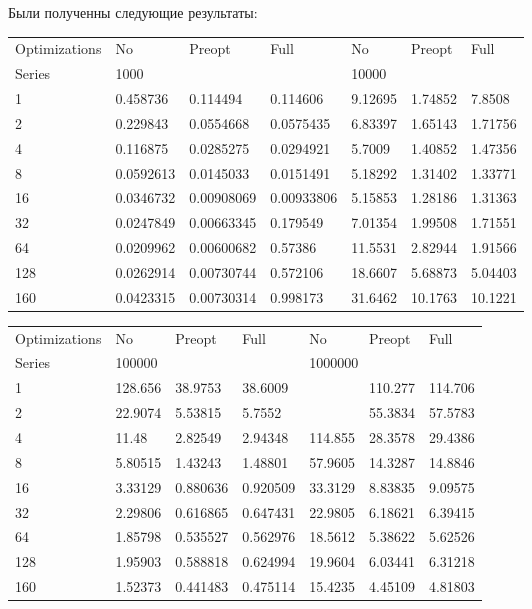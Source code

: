 \documentclass[a4paper,12pt,titlepage,finall]{article}
\begin{document}
\par
Были полученны следующие результаты:
\begin{table}[h]
\begin{tabular}{lllllll}
Optimizations & No        & Preopt     & Full       & No      & Preopt  & Full    \\
Series        & \multicolumn{3}{l}{1000}            & \multicolumn{3}{l}{10000}   \\
1             & 0.458736  & 0.114494   & 0.114606   & 9.12695 & 1.74852 & 7.8508  \\
2             & 0.229843  & 0.0554668  & 0.0575435  & 6.83397 & 1.65143 & 1.71756 \\
4             & 0.116875  & 0.0285275  & 0.0294921  & 5.7009  & 1.40852 & 1.47356 \\
8             & 0.0592613 & 0.0145033  & 0.0151491  & 5.18292 & 1.31402 & 1.33771 \\
16            & 0.0346732 & 0.00908069 & 0.00933806 & 5.15853 & 1.28186 & 1.31363 \\
32            & 0.0247849 & 0.00663345 & 0.179549   & 7.01354 & 1.99508 & 1.71551 \\
64            & 0.0209962 & 0.00600682 & 0.57386    & 11.5531 & 2.82944 & 1.91566 \\
128           & 0.0262914 & 0.00730744 & 0.572106   & 18.6607 & 5.68873 & 5.04403 \\
160           & 0.0423315 & 0.00730314 & 0.998173   & 31.6462 & 10.1763 & 10.1221
\end{tabular}
\end{table}
\begin{table}[h]
\begin{tabular}{lllllll}
Optimizations & No      & Preopt   & Full     & No      & Preopt  & Full    \\
Series        & \multicolumn{3}{l}{100000}    & \multicolumn{3}{l}{1000000} \\
1             & 128.656 & 38.9753  & 38.6009  &         & 110.277 & 114.706 \\
2             & 22.9074 & 5.53815  & 5.7552   &         & 55.3834 & 57.5783 \\
4             & 11.48   & 2.82549  & 2.94348  & 114.855 & 28.3578 & 29.4386 \\
8             & 5.80515 & 1.43243  & 1.48801  & 57.9605 & 14.3287 & 14.8846 \\
16            & 3.33129 & 0.880636 & 0.920509 & 33.3129 & 8.83835 & 9.09575 \\
32            & 2.29806 & 0.616865 & 0.647431 & 22.9805 & 6.18621 & 6.39415 \\
64            & 1.85798 & 0.535527 & 0.562976 & 18.5612 & 5.38622 & 5.62526 \\
128           & 1.95903 & 0.588818 & 0.624994 & 19.9604 & 6.03441 & 6.31218 \\
160           & 1.52373 & 0.441483 & 0.475114 & 15.4235 & 4.45109 & 4.81803
\end{tabular}
\end{table}
\end{document}
